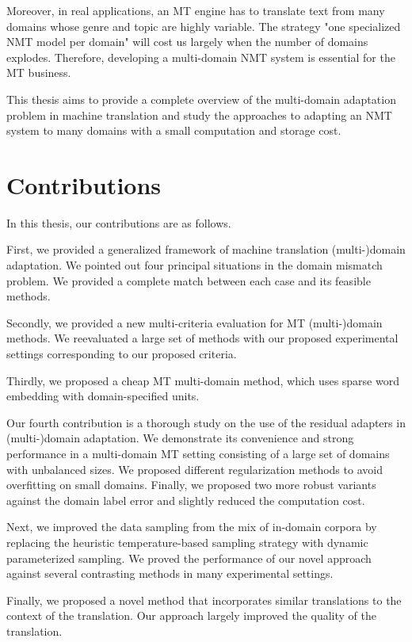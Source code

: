 Moreover, in real applications, an MT engine has to translate text from many domains whose genre and topic are highly variable. The strategy "one specialized NMT model per domain" will cost us largely when the number of domains explodes. Therefore, developing a multi-domain NMT system is essential for the MT business.

This thesis aims to provide a complete overview of the multi-domain adaptation problem in machine translation and study the approaches to adapting an NMT system to many domains with a small computation and storage cost.

\section{Contributions}
In this thesis, our contributions are as follows.

First, we provided a generalized framework of machine translation (multi-)domain adaptation. We pointed out four principal situations in the domain mismatch problem. We provided a complete match between each case and its feasible methods.

Secondly, we provided a new multi-criteria evaluation for MT (multi-)domain methods. We reevaluated a large set of methods with our proposed experimental settings corresponding to our proposed criteria.

Thirdly, we proposed a cheap MT multi-domain method, which uses sparse word embedding with domain-specified units.

Our fourth contribution is a thorough study on the use of the residual adapters in (multi-)domain adaptation. We demonstrate its convenience and strong performance in a multi-domain MT setting consisting of a large set of domains with unbalanced sizes. We proposed different regularization methods to avoid overfitting on small domains. Finally, we proposed two more robust variants against the domain label error and slightly reduced the computation cost.

Next, we improved the data sampling from the mix of in-domain corpora by replacing the heuristic temperature-based sampling strategy with dynamic parameterized sampling. We proved the performance of our novel approach against several contrasting methods in many experimental settings.

Finally, we proposed a novel method that incorporates similar translations to the context of the translation. Our approach largely improved the quality of the translation.


